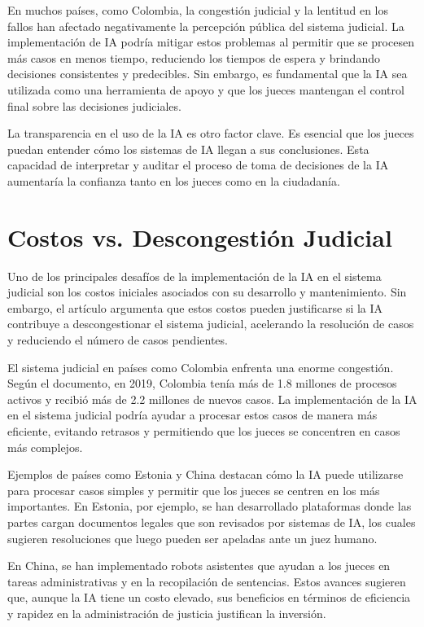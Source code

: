 \documentclass[runningheads]{llncs}
\begin{document}
En muchos países, como Colombia, la congestión judicial y la lentitud en los fallos han afectado negativamente la percepción pública del sistema judicial. La implementación de IA podría mitigar estos problemas al permitir que se procesen más casos en menos tiempo, reduciendo los tiempos de espera y brindando decisiones consistentes y predecibles. Sin embargo, es fundamental que la IA sea utilizada como una herramienta de apoyo y que los jueces mantengan el control final sobre las decisiones judiciales.

La transparencia en el uso de la IA es otro factor clave. Es esencial que los jueces puedan entender cómo los sistemas de IA llegan a sus conclusiones. Esta capacidad de interpretar y auditar el proceso de toma de decisiones de la IA aumentaría la confianza tanto en los jueces como en la ciudadanía.

\section{Costos vs. Descongestión Judicial}
Uno de los principales desafíos de la implementación de la IA en el sistema judicial son los costos iniciales asociados con su desarrollo y mantenimiento. Sin embargo, el artículo argumenta que estos costos pueden justificarse si la IA contribuye a descongestionar el sistema judicial, acelerando la resolución de casos y reduciendo el número de casos pendientes.

El sistema judicial en países como Colombia enfrenta una enorme congestión. Según el documento, en 2019, Colombia tenía más de 1.8 millones de procesos activos y recibió más de 2.2 millones de nuevos casos. La implementación de la IA en el sistema judicial podría ayudar a procesar estos casos de manera más eficiente, evitando retrasos y permitiendo que los jueces se concentren en casos más complejos.

Ejemplos de países como Estonia y China destacan cómo la IA puede utilizarse para procesar casos simples y permitir que los jueces se centren en los más importantes. En Estonia, por ejemplo, se han desarrollado plataformas donde las partes cargan documentos legales que son revisados por sistemas de IA, los cuales sugieren resoluciones que luego pueden ser apeladas ante un juez humano.

En China, se han implementado robots asistentes que ayudan a los jueces en tareas administrativas y en la recopilación de sentencias. Estos avances sugieren que, aunque la IA tiene un costo elevado, sus beneficios en términos de eficiencia y rapidez en la administración de justicia justifican la inversión. 
\end{document}

